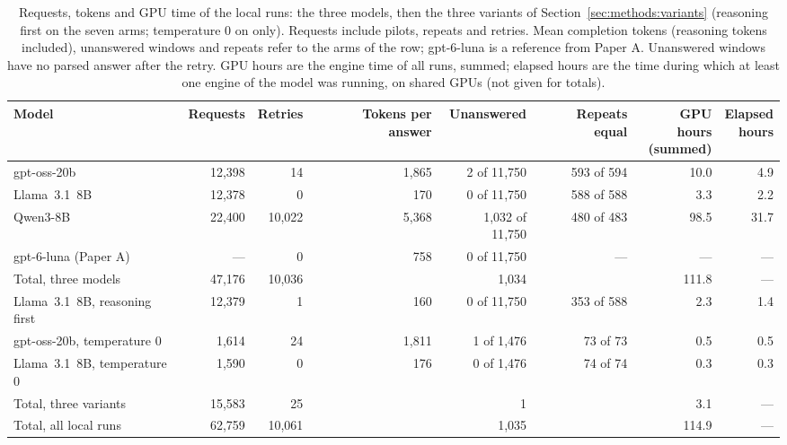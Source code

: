\begin{table}[!t]
\centering
\caption{Requests, tokens and GPU time of the local runs: the three models, then the three variants of Section~\ref{sec:methods:variants} (reasoning first on the seven arms; temperature 0 on  only). Requests include pilots, repeats and retries. Mean completion tokens (reasoning tokens included), unanswered windows and repeats refer to the arms of the row; gpt-6-luna is a reference from Paper A. Unanswered windows have no parsed answer after the retry. GPU hours are the engine time of all runs, summed; elapsed hours are the time during which at least one engine of the model was running, on shared GPUs (not given for totals).}
\label{tab:cost}
\footnotesize
\setlength{\tabcolsep}{3pt}
\begin{tabularx}{\textwidth}{@{}Xrrrrrrr@{}}
\toprule
Model & Requests & Retries & Tokens per answer & Unanswered & Repeats equal & \shortstack[r]{GPU hours\\(summed)} & \shortstack[r]{Elapsed\\hours} \\
\midrule
gpt-oss-20b & 12{,}398 & 14 & 1{,}865 & 2 of 11{,}750 & 593 of 594 & 10.0 & 4.9 \\
Llama~3.1~8B & 12{,}378 & 0 & 170 & 0 of 11{,}750 & 588 of 588 & 3.3 & 2.2 \\
Qwen3-8B & 22{,}400 & 10{,}022 & 5{,}368 & 1{,}032 of 11{,}750 & 480 of 483 & 98.5 & 31.7 \\
gpt-6-luna (Paper A) & --- & 0 & 758 & 0 of 11{,}750 & --- & --- & --- \\
\midrule
Total, three models & 47{,}176 & 10{,}036 & & 1{,}034 & & 111.8 & --- \\
\midrule
Llama~3.1~8B, reasoning first & 12{,}379 & 1 & 160 & 0 of 11{,}750 & 353 of 588 & 2.3 & 1.4 \\
gpt-oss-20b, temperature 0 & 1{,}614 & 24 & 1{,}811 & 1 of 1{,}476 & 73 of 73 & 0.5 & 0.5 \\
Llama~3.1~8B, temperature 0 & 1{,}590 & 0 & 176 & 0 of 1{,}476 & 74 of 74 & 0.3 & 0.3 \\
Total, three variants & 15{,}583 & 25 & & 1 & & 3.1 & --- \\
Total, all local runs & 62{,}759 & 10{,}061 & & 1{,}035 & & 114.9 & --- \\
\bottomrule
\end{tabularx}
\end{table}
